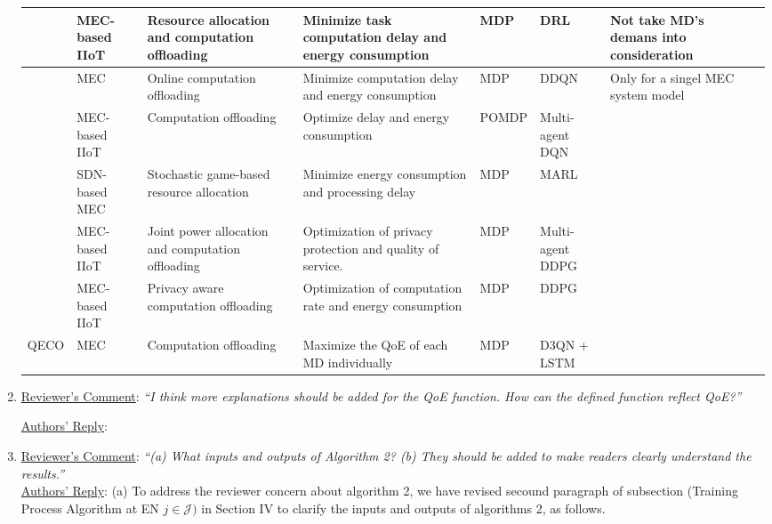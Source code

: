 \documentclass[12pt,draftclsnofoot,onecolumn]{IEEEtran}
\begin{document}
\begin{enumerate}
\begin{table}[htbp]
{{\begin{tabular}{ lp{2.3cm}p{4.5cm}p{5cm}p{1.5cm}p{3cm}p{5cm}l}
					\cite{gong2022edge} & MEC-based IIoT & Resource allocation and computation offloading & Minimize task computation delay and energy consumption & MDP & DRL & Not take MD's demans into consideration\\\midrule
					\cite{liao2023online} & MEC & Online computation offloading & Minimize computation delay and energy consumption & MDP & DDQN & Only for a singel MEC system model  \\\midrule
					\cite{wu2023multi} & MEC-based IIoT & Computation offloading & Optimize delay and energy consumption & POMDP & Multi-agent DQN& \\\midrule
					\cite{wu2023computation} & SDN-based MEC & Stochastic game-based resource allocation & Minimize energy consumption and processing delay & MDP & MARL & \\\midrule
					\cite{wu2024privacy} & MEC-based IIoT  & Joint power allocation and computation offloading  & Optimization of privacy protection and quality of service. & MDP & Multi-agent DDPG & \\\midrule
					\cite{wu2024combining} & MEC-based IIoT & Privacy aware computation offloading & Optimization of computation rate and energy consumption & MDP & DDPG  & \\\midrule
					QECO &  MEC &  Computation offloading & Maximize the QoE of each MD individually &MDP & D3QN + LSTM & \\
					\toprule
			\end{tabular}}
			\label{table}}
	\end{table}
	
	
	\newpage
	\item \underline{Reviewer's Comment}: 
	\textit{``I think more explanations should be added for the QoE function. How can the defined function reflect QoE?''} \newline
	
	\underline{Authors' Reply}:\\
	\newpage
	\item \underline{Reviewer's Comment}: 
	\textit{``(a) What inputs and outputs of Algorithm 2? (b) They should be added to make readers clearly understand the results.''} \\\newline
	\underline{Authors' Reply}: (a) To address the reviewer concern about algorithm 2, we have revised secound paragraph of subsection (Training Process Algorithm at EN $j \in \mathcal{J})$ in Section IV to clarify the inputs and outputs of algorithms 2, as follows. \newline
	

\end{enumerate}
\end{document}
